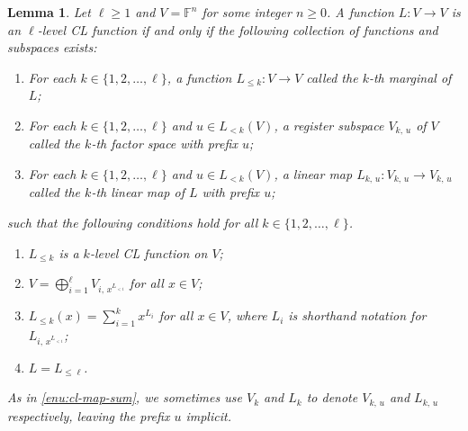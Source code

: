 \documentclass[11pt]{article}
\newtheorem{lemma}[theorem]{Lemma}
\theoremstyle{definition}
\newcommand{\F}{\ensuremath{\mathbb{F}}}
\begin{document}
\begin{lemma}
  \label{lem:cl-kth}
	Let $\ell \geq 1$ and $V = \F^n$ for some integer $n \geq 0$.
  A function $L: V \to V$ is an $\ell$-level CL function if and only if the
  following collection of functions and subspaces exists:
  \begin{enumerate}[label=(\roman*)]
  \item \label{enu:cl-k-marginal} For each $k \in \{1, 2, \ldots, \ell\}$, a
    function $L_{\le k} : V \to V$ called the \emph{$k$-th marginal of $L$};
  \item \label{enu:cl-k-space} For each $k \in \{1, 2, \ldots, \ell\}$ and $u
    \in L_{<k} (V)$, a register subspace $V_{k,\, u}$ of $V$ called the
    \emph{$k$-th factor space with prefix $u$};
  \item \label{enu:cl-k-map} For each $k \in \{1, 2, \ldots, \ell\}$ and $u \in
    L_{<k} (V)$, a linear map $L_{k,\, u} : V_{k,\, u} \to V_{k,\, u}$ called
    the \emph{$k$-th linear map of $L$ with prefix $u$};
  \end{enumerate}
  such that the following conditions hold for all $k \in \{1, 2, \ldots,
  \ell\}$.
  \begin{enumerate}
  \item \label{enu:cl-k-cl} $L_{\leq k}$ is a $k$-level CL function on $V$;
	\item \label{enu:cl-space-sum} $V = \bigoplus_{i = 1}^\ell V_{i,\,
      x^{L_{<i}}}$ for all $x \in V$;
\item \label{enu:cl-map-sum} $L_{\leq k}(x) = \sum_{i = 1}^{k} x^{L_i}$ for
    all $x \in V$, where $L_i$ is shorthand notation for $L_{i,\,
      x^{L_{<i}}}$;
  \item \label{enu:cl-last-ell} $L = L_{\leq \ell}$.
  \end{enumerate}
  As in \cref{enu:cl-map-sum}, we sometimes use $V_k$ and $L_k$ to denote
  $V_{k,\, u}$ and $L_{k,\, u}$ respectively, leaving the prefix $u$ implicit.
\end{lemma}
\end{document}
